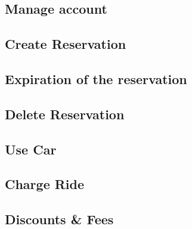 \newpage
\subsection{Manage account}
  

\newpage
\subsection{Create Reservation}
  

\newpage
\subsection{Expiration of the reservation}
  
  
\newpage
\subsection{Delete Reservation}
  

\newpage
\subsection{Use Car}
  

\newpage
\subsection{Charge Ride}
   

\newpage
\subsection{Discounts \& Fees}
   


